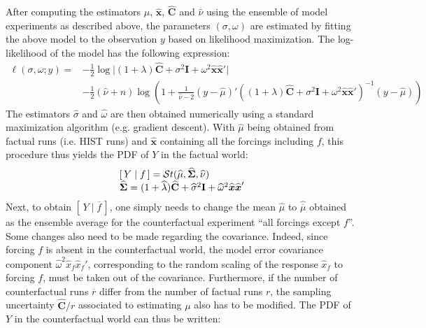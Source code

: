 \documentclass[12pt]{article}
\newcommand{\Sig}{\mbox{\boldmath \(\Sigma\)}}
\newcommand{\x}{\boldsymbol{x}}
\begin{document}
After computing the estimators $\widehat{\mu}$, $\widehat{\x}$, $\widehat{\mathbf{C}}$ and $\widehat{\nu}$ using the ensemble of model experiments as described above, the parameters  $(\sigma, \omega)$ are estimated by fitting the above model to the observation $y$ based on likelihood maximization. The log-likelihood of the model has the following expression:
\begin{equation} 
\label{llk}
\begin{array}{ll}
\ell(\sigma, \omega; y)= &-\frac{1}{2}\log\vert(1+\lambda)\widehat{\mathbf{C}}+\sigma^2 \mathbf I+\omega^2\widehat{\x}\widehat{\x}'\vert\\
&-\frac{1}{2}(\widehat\nu+n)\log\left(1+\frac{1}{\widehat\nu-2}(y-\widehat{\mu})'\left((1+\lambda)\widehat{\mathbf{C}}+\sigma^2 \mathbf I+\omega^2\widehat{\x}\widehat{\x}'\right)^{-1}(y-\widehat{\mu})\right)
\end{array}
\end{equation}
The estimators $\widehat{\sigma}$ and $\widehat{\omega}$ are then obtained numerically using a standard maximization algorithm (e.g. gradient descent). With $\widehat{\mu}$ being obtained from factual runs (i.e. HIST runs) and $\widehat{\x}$ containing all the forcings including $f$, this procedure thus yields the PDF of $Y$ in the factual world: 
\begin{equation} 
\label{factPDF}
\begin{array}{ll}
\left[\, Y\mid f\,\right] = \mathcal{S}t(\widehat{\mu},\widehat{\Sig},\widehat{\nu})\\
\widehat{\Sig}=(1+\widehat{\lambda})\widehat{\mathbf{C}}+\widehat{\sigma}^2 \mathbf I+\widehat\omega^2\widehat{\x}\widehat{\x}'
\end{array}
\end{equation}
Next, to obtain $\left[\, Y\mid \overline{f}\,\right]$, one simply needs to change the mean $\widehat{\mu}$ to $\widehat{\overline{\mu}}$ obtained as the ensemble average for the counterfactual experiment ``all forcings except $f$''. Some changes also need to be made regarding the covariance. Indeed, since forcing $f$ is absent in the counterfactual world, the model error covariance component $\widehat\omega^2\widehat x_f\widehat x_f'$, corresponding to the random scaling of the response $\widehat x_f$ to forcing $f$, must be taken out of the covariance. Furthermore, if the number of counterfactual runs $\overline r$ differ from the number of factual runs $r$, the sampling uncertainty $\widehat{\mathbf C}/r$ associated to estimating $\mu$ also has to be modified. The PDF of $Y$ in the counterfactual world can thus be written:
\end{document}
